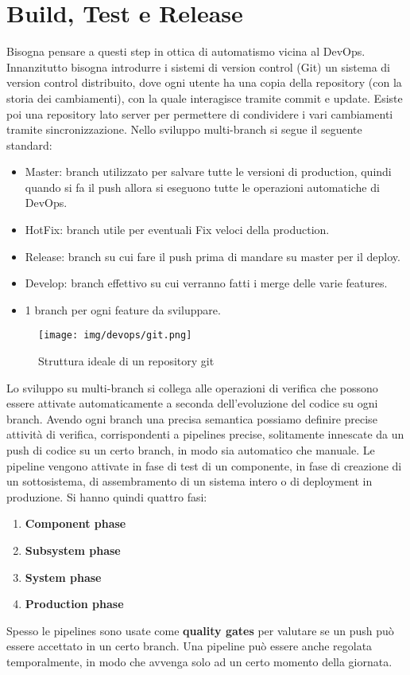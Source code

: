 \section{Build, Test e Release}
Bisogna pensare a questi step in ottica di automatismo vicina al DevOps.
Innanzitutto bisogna introdurre i sistemi di version control (Git) un sistema di
version control distribuito, dove ogni utente ha una copia della repository
(con la storia dei cambiamenti), con la quale interagisce tramite commit e update.
Esiste poi una repository lato server per permettere di condividere i vari
cambiamenti tramite sincronizzazione. Nello sviluppo multi-branch si segue il
seguente standard:
\begin{itemize}
      \item Master: branch utilizzato per salvare tutte le versioni di production,
            quindi quando si fa il push allora si eseguono tutte le operazioni
            automatiche di DevOps.
      \item HotFix: branch utile per eventuali Fix veloci della production.
      \item Release: branch su cui fare il push prima di mandare su master per
            il deploy.
      \item Develop: branch effettivo su cui verranno fatti i merge delle
            varie features.
      \item 1 branch per ogni feature da sviluppare.
\end{itemize}
\begin{figure}[!ht]
      \centering
      \texttt{[image: img/devops/git.png]}
      \caption{Struttura ideale di un repository git}
      \label{fig:git}
\end{figure}
Lo sviluppo su multi-branch si collega alle operazioni di verifica che possono
essere attivate automaticamente a seconda dell'evoluzione del codice su ogni branch.
Avendo ogni branch una precisa semantica possiamo definire precise attività di
verifica, corrispondenti a pipelines precise, solitamente innescate da un push di
codice su un certo branch, in modo sia automatico che manuale.
Le pipeline vengono attivate in fase di test di un componente, in fase di creazione
di un sottosistema, di assembramento di un sistema intero o di deployment in
produzione. Si hanno quindi quattro fasi:
\begin{enumerate}
      \item \textbf{Component phase}
      \item \textbf{Subsystem phase}
      \item \textbf{System phase}
      \item \textbf{Production phase}
\end{enumerate}
Spesso le pipelines sono usate come \textbf{quality gates} per valutare se un push
può essere accettato in un certo branch. Una pipeline può essere anche regolata
temporalmente, in modo che avvenga solo ad un certo momento della giornata.
